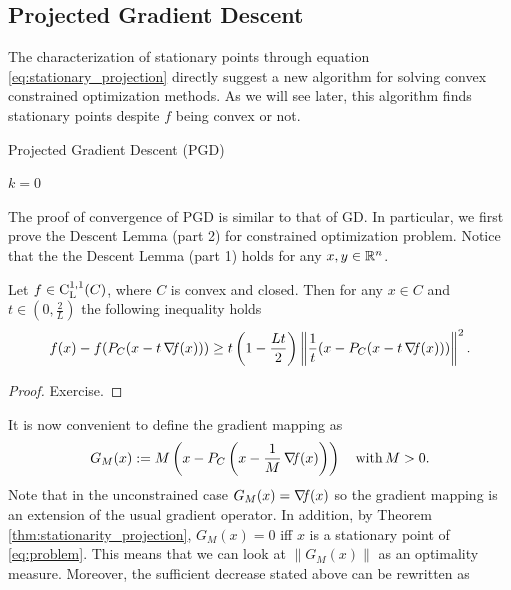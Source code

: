 \documentclass[10pt,a4paper]{article}
\begin{document}
\subsection{Projected Gradient Descent}
The characterization of stationary points through equation \eqref{eq:stationary_projection} directly suggest a new algorithm for solving convex constrained optimization methods. As we will see later, this algorithm finds stationary points despite $f$ being convex or not. \\
\begin{algorithm}[H]\label{alg}
	\caption{Projected Gradient Descent (PGD)}
	
	
	$k = 0$
	
\end{algorithm}
The proof of convergence of PGD is similar to that of GD. In particular, we first prove the Descent Lemma (part 2) for constrained optimization problem. Notice that the the Descent Lemma (part 1) holds for any $x, y \in \mathbb{R}^n$.
\begin{lemma}\label{lemma:descent_projected_lemma}
	Let $f\in \mathord{\mathrm{C^{1,1}_{L}}}(C)$, where $C$ is convex and closed. Then for any $x\in C$ and $t\in (0,\frac{2}{L})$ the following inequality holds
	\begin{equation*}
		f(x)-f(P_C(x-t\operatorname*{\mathit{\nabla \!f}}(x))) \geq t\left(1- \frac{Lt}{2}\right) \left\| \frac{1}{t}(x-P_C(x-t\operatorname*{\mathit{\nabla \!f}}(x))) \right\|^2.
	\end{equation*}
\end{lemma}
\begin{proof}
	Exercise.
\end{proof}
\noindent It is now convenient to define the gradient mapping as
\begin{equation}\label{eq:gradient}
	G_M(x) := M \left(x-P_C\left(x-\frac{1}{M}\operatorname*{\mathit{\nabla \!f}}(x)\right)\right) \quad\mathord{\mathrm{with }}\, M>0.
\end{equation}
Note that in the unconstrained case $G_M(x)=\operatorname*{\mathit{\nabla \!f}}(x)$ so the gradient mapping is an extension of the usual gradient operator. In addition, by Theorem \ref{thm:stationarity_projection}, $G_M(x) = 0$ iff $x$ is a stationary point of \eqref{eq:problem}. This means that we can look at $\|G_M(x)\|$ as an optimality measure. Moreover, the sufficient decrease stated above can be rewritten as 
\end{document}
